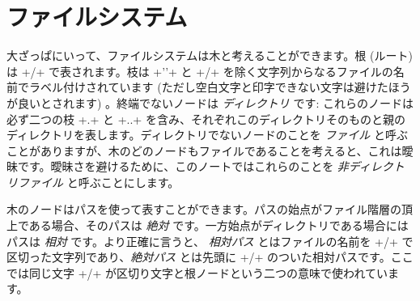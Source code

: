 \section{ファイルシステム}

大ざっぱにいって、ファイルシステムは木と考えることができます。根 (ルート)は \ml+/+ で表されます。枝は \ml+''+ と \ml+/+ を除く文字列からなるファイルの名前でラベル付けされています (ただし空白文字と印字できない文字は避けたほうが良いとされます) 。終端でないノードは \emph{ディレクトリ} です: これらのノードは必ず二つの枝 \ml+.+ と \ml+..+ を含み、それぞれこのディレクトリそのものと親のディレクトリを表します。ディレクトリでないノードのことを \emph{ファイル} と呼ぶことがありますが、木のどのノードもファイルであることを考えると、これは曖昧です。曖昧さを避けるために、このノートではこれらのことを \emph{非ディレクトリファイル} と呼ぶことにします。

木のノードはパスを使って表すことができます。パスの始点がファイル階層の頂上である場合、そのパスは \emph{絶対} です。一方始点がディレクトリである場合にはパスは \emph{相対} です。より正確に言うと、 \emph{相対パス} とはファイルの名前を \ml+/+ で区切った文字列であり、\emph{絶対パス} とは先頭に \ml+/+ のついた相対パスです。ここでは同じ文字 \ml+/+ が区切り文字と根ノードという二つの意味で使われています。

